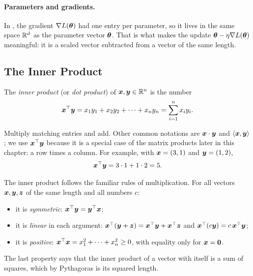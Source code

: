 \paragraph{Parameters and gradients.}
In , the gradient $\nabla L(\bm{\theta})$ had one entry
per parameter, so it lives in the same space $\mathbb{R}^d$ as the parameter
vector $\bm{\theta}$. That is what makes the update
$\bm{\theta} - \eta \nabla L(\bm{\theta})$ meaningful: it is a scaled
vector subtracted from a vector of the same length.

\subsection{The Inner Product}
\label{sec:ch03-inner-product}

\begin{definition}
  \label{def:inner-product}
  The \emph{inner product} (or \emph{dot product}) of
  $\bm{x}, \bm{y} \in \mathbb{R}^n$ is the number
  \[
    \bm{x}^\top \bm{y} = x_1 y_1 + x_2 y_2 + \dots + x_n y_n
    = \sum_{i=1}^n x_i y_i .
  \]
\end{definition}

Multiply matching entries and add. Other common notations are
$\bm{x} \cdot \bm{y}$ and $\langle \bm{x}, \bm{y} \rangle$; we use
$\bm{x}^\top \bm{y}$ because it is a special case of the matrix
products later in this chapter: a row times a column. For example, with
$\bm{x} = (3, 1)$ and $\bm{y} = (1, 2)$,
\[
  \bm{x}^\top \bm{y} = 3 \cdot 1 + 1 \cdot 2 = 5 .
\]

The inner product follows the familiar rules of multiplication. For all
vectors $\bm{x}, \bm{y}, \bm{z}$ of the same length and all numbers
$c$:
\begin{itemize}
  \item it is \emph{symmetric}: $\bm{x}^\top \bm{y} = \bm{y}^\top
    \bm{x}$;
  \item it is \emph{linear} in each argument:
    $\bm{x}^\top (\bm{y} + \bm{z}) = \bm{x}^\top \bm{y} +
    \bm{x}^\top \bm{z}$ and $\bm{x}^\top (c \bm{y}) =
    c\, \bm{x}^\top \bm{y}$;
  \item it is \emph{positive}: $\bm{x}^\top \bm{x} = x_1^2 + \dots +
    x_n^2 \ge 0$, with equality only for $\bm{x} = \bm{0}$.
\end{itemize}

The last property says that the inner product of a vector with itself is
a sum of squares, which by Pythagoras is its squared length.

